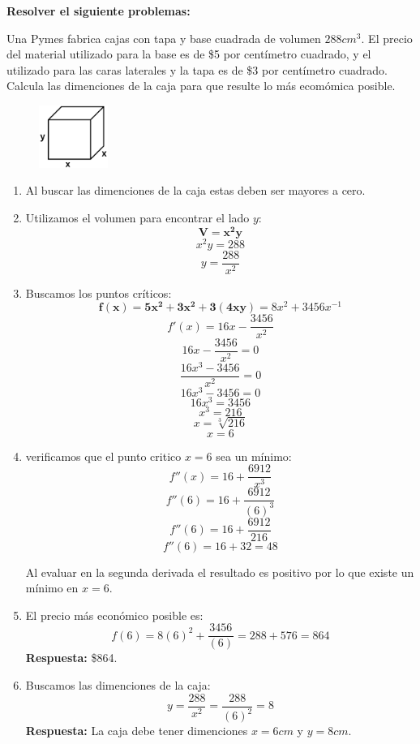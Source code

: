 \documentclass[12pt]{article}
\begin{document}
    

    \textbf{Resolver el siguiente problemas: }

    Una Pymes fabrica cajas con tapa y base cuadrada de volumen $288cm^3$. El precio del material utilizado para la base es de \$5 por centímetro cuadrado, y el utilizado para las caras laterales y la tapa es de \$3 por centímetro cuadrado. Calcula las dimenciones de la caja para que resulte lo más ecomómica posible.

    \begin{figure}[h!]
        \centering
        \includegraphics[width=0.2\textwidth]{img/t4.png}
    \end{figure}

    \begin{enumerate}[label=\textbf{\arabic*)}] 
        \item Al buscar las dimenciones de la caja estas deben ser mayores a cero.
        
        \item Utilizamos el volumen para encontrar el lado $y$: \[\bm{V = x^2y}\]
            \[x^2y = 288\]
            \[y = \frac{288}{x^2}\]

        \item Buscamos los puntos críticos: \[\bm{f(x) = 5x^2 + 3x^2 + 3(4xy)} = 8x^2 + 3456x^{-1}\]
            \[f'(x) = 16x - \frac{3456}{x^2}\]
            \[16x - \frac{3456}{x^2} = 0\]
            \[\frac{16x^3 - 3456}{x^2} = 0\]
            \[16x^3 - 3456 = 0\]
            \[16x^3 = 3456\]
            \[x^3 = 216\]
            \[x = \sqrt[3]{216}\]
            \[x = 6\]

        \item verificamos que el punto critico $x = 6$ sea un mínimo: \[f''(x) = 16 + \frac{6912}{x^3}\]
            \[f''(6) = 16 + \frac{6912}{(6)^3}\]
            \[f''(6) = 16 + \frac{6912}{216}\]
            \[f''(6) = 16 + 32 = 48\]

            Al evaluar en la segunda derivada el resultado es positivo por lo que existe un mínimo en $x = 6$.
        
        \item El precio más económico posible es:
            \[f(6) = 8(6)^2 + \frac{3456}{(6)} = 288 + 576 = 864\]
            \textbf{Respuesta:} \$864.
        
        \item Buscamos las dimenciones de la caja:
            \[y = \frac{288}{x^2} = \frac{288}{(6)^2} = 8\]
            \textbf{Respuesta:} La caja debe tener dimenciones $x = 6cm$ y $y = 8cm$.
    \end{enumerate}
\end{document}
